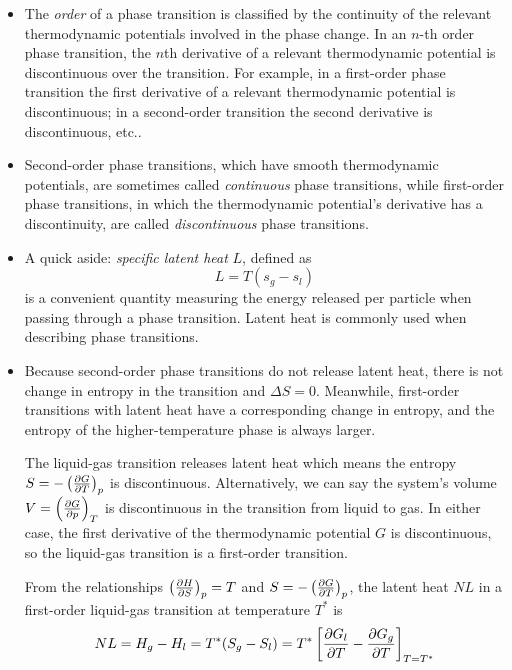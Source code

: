 \documentclass[11pt, a4paper]{article}
\newcommand{\pdveval}[3]{\left(\pdv{#1}{#2}\right)_{#3}}
\begin{document}
\begin{itemize}
	\item The \textit{order} of a phase transition is classified by the continuity of the relevant thermodynamic potentials involved in the phase change. In an $ n $-th order phase transition, the $ n $th derivative of a relevant thermodynamic potential is discontinuous over the transition. For example, in a first-order phase transition the first derivative of a relevant thermodynamic potential is discontinuous; in a second-order transition the second derivative is discontinuous, etc..
	
	\item Second-order phase transitions, which have smooth thermodynamic potentials, are sometimes called \textit{continuous} phase transitions, while first-order phase transitions, in which the thermodynamic potential's derivative has a discontinuity, are called \textit{discontinuous} phase transitions.
	
	\item A quick aside: \textit{specific latent heat} $ L $, defined as
	\begin{equation*}
		L = T(s_{g} - s_{l})
	\end{equation*}
	is a convenient quantity measuring the energy released per particle when passing through a phase transition. Latent heat is commonly used when describing phase transitions.
	
	\item Because second-order phase transitions do not release latent heat, there is not change in entropy in the transition and $ \Delta S = 0 $. Meanwhile, first-order transitions with latent heat have a corresponding change in entropy, and the entropy of the higher-temperature phase is always larger.
	
	The liquid-gas transition releases latent heat which means the entropy $ S = -\pdveval{G}{T}{p} $ is discontinuous. Alternatively, we can say the system's volume $ V = \pdveval{G}{p}{T} $ is discontinuous in the transition from liquid to gas. In either case, the first derivative of the thermodynamic potential $ G $ is discontinuous, so the liquid-gas transition is a first-order transition. 
	
	From the relationships $ \pdveval{H}{S}{p} = T $ and $ S = - \pdveval{G}{T}{p} $, the latent heat $ N L $ in a first-order liquid-gas transition at temperature $ T^{*} $ is
	\begin{equation*}
		N L = H_{g} - H_{l} = T^{*}(S_{g} - S_{l}) = T^{*} \left[\pdv{G_{l}}{T} - \pdv{G_{g}}{T} \right]_{T=T^{*}}
	\end{equation*}
	
\end{itemize}
\end{document}
